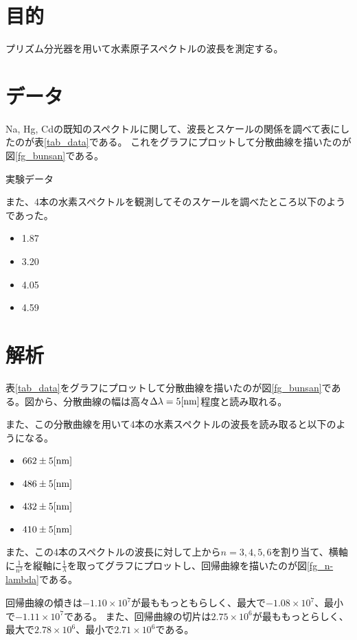 \documentclass[uplatex,11pt]{jsarticle}
\newcommand{\tab}[4]{ %
    \begin{table}[htb]
        \centering
        \caption{#3}
        
        \label{tab_#1}
    \end{table}
}
\newcommand{\fr}[1]{図\ref{fg_#1}}
\newcommand{\tr}[1]{表\ref{tab_#1}}
\begin{document}
\section{目的}

プリズム分光器を用いて水素原子スペクトルの波長を測定する。

\section{データ}

Na, Hg, Cdの既知のスペクトルに関して、波長とスケールの関係を調べて表にしたのが\tr{data}である。
これをグラフにプロットして分散曲線を描いたのが\fr{bunsan}である。

\tab{data}{csv/bunsan.csv}{実験データ}{2}

また、4本の水素スペクトルを観測してそのスケールを調べたところ以下のようであった。

\begin{itemize}
  \item 1.87
  \item 3.20
  \item 4.05
  \item 4.59
\end{itemize}

\section{解析}

\tr{data}をグラフにプロットして分散曲線を描いたのが\fr{bunsan}である。図から、分散曲線の幅は高々$\Delta\lambda = 5[{\rm nm}]$程度と読み取れる。

また、この分散曲線を用いて4本の水素スペクトルの波長を読み取ると以下のようになる。

\begin{itemize}
    \item $662 \pm 5 [{\rm nm}]$
    \item $486 \pm 5 [{\rm nm}]$
    \item $432 \pm 5 [{\rm nm}]$
    \item $410 \pm 5 [{\rm nm}]$
\end{itemize}

また、この4本のスペクトルの波長に対して上から$n=3,4,5,6$を割り当て、横軸に$\frac{1}{n^2}$を縦軸に$\frac{1}{\lambda}$を取ってグラフにプロットし、回帰曲線を描いたのが\fr{n-lambda}である。

回帰曲線の傾きは$-1.10 \times 10^7$が最ももっともらしく、最大で$-1.08\times 10^7$、最小で$-1.11\times 10^7$である。
また、回帰曲線の切片は$2.75\times 10^6$が最ももっとらしく、最大で$2.78\times 10^6$、最小で$2.71\times 10^6$である。
\end{document}
